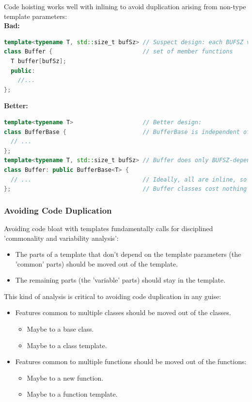 Code hoisting works well with inlining to avoid duplication arising from non-type template parameters:\\
\textbf{Bad:}
\begin{lstlisting}[language=C++]
template<typename T, std::size_t bufSz> // Suspect design: each BUFSZ value will yield a new
class Buffer {                          // set of member functions
  T buffer[bufSz];
  public:
    //...
};
\end{lstlisting}
\textbf{Better:}
\begin{lstlisting}[language=C++]
template<typename T>                    // Better design:
class BufferBase {                      // BufferBase is independent of bufSz
  // ...
};
template<typename T, std::size_t bufSz> // Buffer does only BUFSZ-dependent operations.
class Buffer: public BufferBase<T> {
  // ...                                // Ideally, all are inline, so
};                                      // Buffer classes cost nothing
\end{lstlisting}

\subsubsection{Avoiding Code Duplication}
Avoiding code bloat with templates fundamentally calls for disciplined 'commonality and variability analysis':
\begin{itemize}
  \item The parts of a template that don't depend on the template parameters (the 'common' parts) should be moved out of the template.
  \item The remaining parts (the 'variable' parts) should stay in the template.
\end{itemize}
This kind of analysis is critical to avoiding code duplication in any guise:
\begin{itemize}
  \item Features common to multiple classes should be moved out of the classes.
  \begin{itemize}
    \item Maybe to a base class.
    \item Maybe to a class template.
  \end{itemize}
  \item Features common to multiple functions should be moved out of the functions:
  \begin{itemize}
    \item Maybe to a new function.
    \item Maybe to a function template.
  \end{itemize}
\end{itemize}

